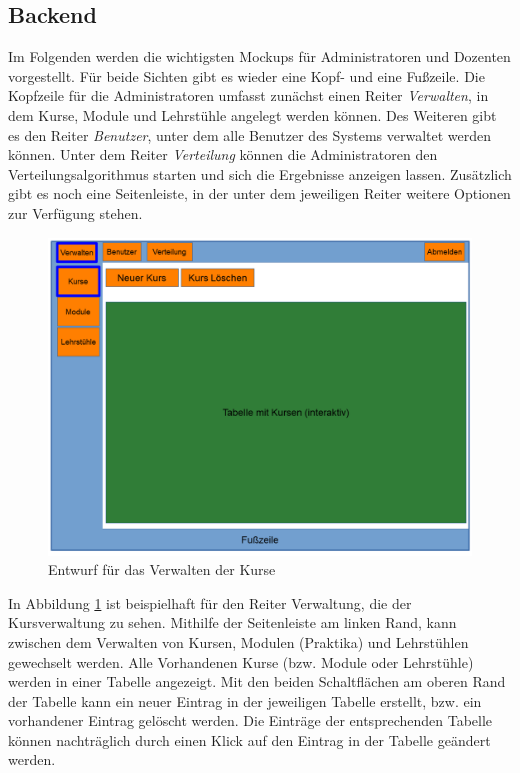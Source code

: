         \subsection{Backend}
	        Im Folgenden werden die wichtigsten Mockups für Administratoren und Dozenten vorgestellt.
	        Für beide Sichten gibt es wieder eine Kopf- und eine Fußzeile.
	        Die Kopfzeile für die Administratoren umfasst zunächst einen Reiter \textit{Verwalten}, in dem Kurse, Module und Lehrstühle angelegt werden können.
	        Des Weiteren gibt es den Reiter \textit{Benutzer}, unter dem alle Benutzer des Systems verwaltet werden können.
	        Unter dem Reiter \textit{Verteilung} können die Administratoren den Verteilungsalgorithmus starten und sich die Ergebnisse anzeigen lassen.
	        Zusätzlich gibt es noch eine Seitenleiste, in der unter dem jeweiligen Reiter weitere Optionen zur Verfügung stehen.
        	
        	\begin{figure}[t]
        		\centering
        		\includegraphics[width=\textwidth]{./design/images/MockUpsBackend/backendManageCourses.png}
        		\caption{Entwurf für das Verwalten der Kurse}
        		\label{fig:mockupManageCourses}
        	\end{figure}
        	
        	In Abbildung \ref{fig:mockupManageCourses} ist beispielhaft für den Reiter Verwaltung, die der Kursverwaltung zu sehen.
        	Mithilfe der Seitenleiste am linken Rand, kann zwischen dem Verwalten von Kursen, Modulen (Praktika) und Lehrstühlen gewechselt werden.
        	Alle Vorhandenen Kurse (bzw. Module oder Lehrstühle) werden in einer Tabelle angezeigt.
        	Mit den beiden Schaltflächen am oberen Rand der Tabelle kann ein neuer Eintrag in der jeweiligen Tabelle erstellt, bzw. ein vorhandener Eintrag gelöscht werden.
        	Die Einträge der entsprechenden Tabelle können nachträglich durch einen Klick auf den Eintrag in der Tabelle geändert werden.
        	
